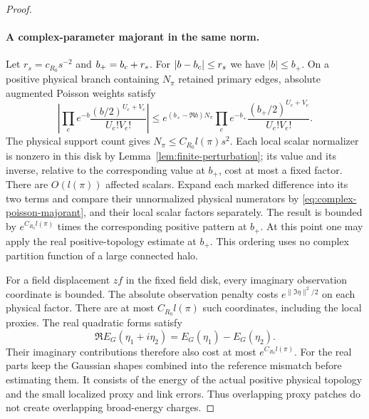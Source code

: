 \begin{proof}
\paragraph{A complex-parameter majorant in the same norm.}
Let $r_s=c_{R_0}s^{-2}$ and $b_+=b_c+r_s$.  For $|b-b_c|\le r_s$ we
have $|b|\le b_+$.  On a positive physical branch containing $N_\pi$
retained primary edges, absolute augmented Poisson weights satisfy
\begin{equation}\label{eq:complex-poisson-majorant}
 \left|\prod_e e^{-b}\frac{(b/2)^{U_e+V_e}}{U_e!V_e!}\right|
 \le e^{(b_+-\Re b)N_\pi}
       \prod_e e^{-b_+}\frac{(b_+/2)^{U_e+V_e}}{U_e!V_e!}.
\end{equation}
The physical support count gives $N_\pi\le C_{R_0}l(\pi)s^2$.
Each local scalar normalizer is nonzero in this disk by
Lemma~\ref{lem:finite-perturbation}; its value and its inverse, relative
to the corresponding value at $b_+$, cost at most a fixed factor.
There are $O(l(\pi))$ affected scalars.  Expand each marked difference
into its two terms and compare their unnormalized physical numerators
by \eqref{eq:complex-poisson-majorant}, and their local scalar factors
separately.  The result is bounded by $e^{C_{R_0}l(\pi)}$ times the
corresponding positive pattern at $b_+$.  At this point one may apply
the real positive-topology estimate at $b_+$.  This ordering uses no
complex partition function of a large connected halo.

For a field displacement $zf$ in the fixed field disk, every imaginary
observation coordinate is bounded.  The absolute observation penalty
costs $e^{\|\Im\eta\|^2/2}$ on each physical factor.  There are at
most $C_{R_0}l(\pi)$ such coordinates, including the local proxies.
The real quadratic forms satisfy
\[
                 \Re E_G(\eta_1+i\eta_2)=E_G(\eta_1)-E_G(\eta_2).
\]
Their imaginary contributions therefore also cost at most
$e^{C_{R_0}l(\pi)}$.  For the real parts keep the Gaussian shapes
combined into the reference mismatch before estimating them.  It
consists of the energy of the actual positive physical topology and
the small localized proxy and link errors.  Thus overlapping proxy
patches do not create overlapping broad-energy charges.


\end{proof}
